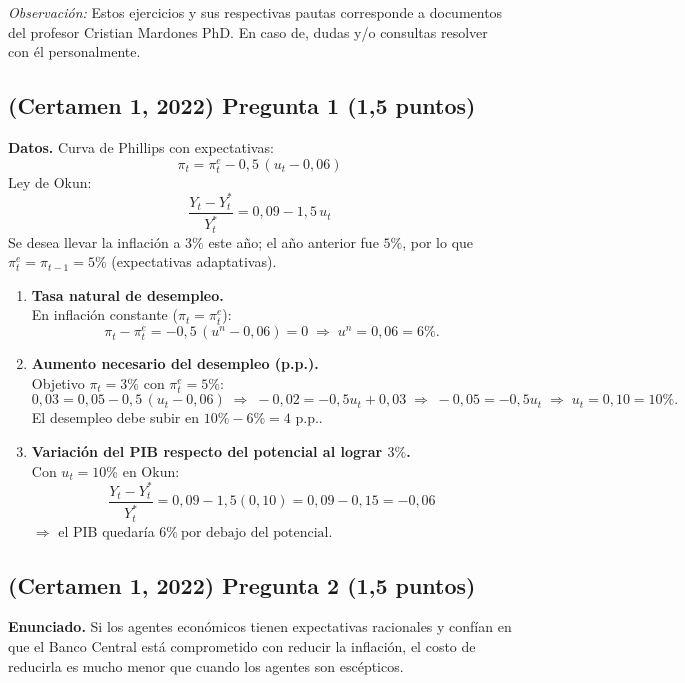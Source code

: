 \documentclass[11pt,addpoints]{article}
\begin{document}
\begin{center}
\textit{Observación:} Estos ejercicios y sus respectivas pautas corresponde a documentos del profesor Cristian Mardones PhD. En caso de, dudas y/o consultas resolver con él personalmente.
\end{center}
\subsection*{(Certamen 1, 2022) \quad Pregunta 1 (1,5 puntos)}

\textbf{Datos.} Curva de Phillips con expectativas:
\[
\pi_t=\pi_t^{e}-0{,}5\,(u_t-0{,}06)
\]
Ley de Okun:
\[
\frac{Y_t-Y_t^*}{Y_t^*}=0{,}09-1{,}5\,u_t
\]
Se desea llevar la inflación a \(3\%\) este año; el año anterior fue \(5\%\), por lo que
\(\pi_t^{e}=\pi_{t-1}=5\%\) (expectativas adaptativas).

\begin{enumerate}[label=\alph*)]
\item \textbf{Tasa natural de desempleo.}\\
En inflación constante (\(\pi_t=\pi_t^{e}\)):
\[
\pi_t-\pi_t^{e}= -0{,}5\,(u^n-0{,}06)=0 \;\Rightarrow\; u^n=\boxed{0{,}06=6\%}.
\]

\item \textbf{Aumento necesario del desempleo (p.p.).}\\
Objetivo \(\pi_t=3\%\) con \(\pi_t^{e}=5\%\):
\[
0{,}03=0{,}05-0{,}5\,(u_t-0{,}06)
\;\Rightarrow\;
-0{,}02=-0{,}5u_t+0{,}03
\;\Rightarrow\;
-0{,}05=-0{,}5u_t
\;\Rightarrow\;
u_t=\boxed{0{,}10=10\%}.
\]
El desempleo debe subir en \(\boxed{10\%-6\%=4\text{ p.p.}}\).

\item \textbf{Variación del PIB respecto del potencial al lograr \(3\%\).}\\
Con \(u_t=10\%\) en Okun:
\[
\frac{Y_t-Y_t^*}{Y_t^*}=0{,}09-1{,}5(0{,}10)=0{,}09-0{,}15=\boxed{-0{,}06}
\]
\(\Rightarrow\) el PIB quedaría \(\boxed{6\%\ \text{por debajo del potencial}}.\)
\end{enumerate}
\subsection*{(Certamen 1, 2022) \quad Pregunta 2 (1,5 puntos)}

\textbf{Enunciado.}  
Si los agentes económicos tienen expectativas racionales y confían en que el Banco Central está comprometido con reducir la inflación, el costo de reducirla es mucho menor que cuando los agentes son escépticos.  
\end{document}
